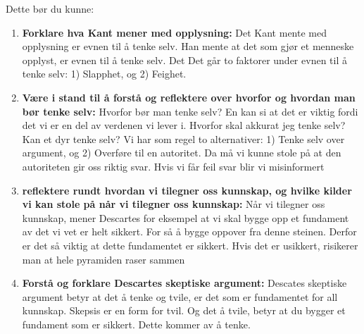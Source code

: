 \documentclass[11pt]{article}
\begin{document}
Dette bør du kunne:
\begin{enumerate}
    \item \textbf{Forklare hva Kant mener med opplysning:} Det Kant mente med opplysning er evnen til å tenke selv. Han mente at det som gjør et menneske opplyst, er evnen til å tenke selv. Det Det går to faktorer under evnen til å tenke selv: 1) Slapphet, og 2) Feighet.
    \item \textbf{Være i stand til å forstå og reflektere over hvorfor og hvordan man bør tenke selv:} Hvorfor bør man tenke selv? En kan si at det er viktig fordi det vi er en del av verdenen vi lever i. Hvorfor skal akkurat jeg tenke selv? Kan et dyr tenke selv? Vi har som regel to alternativer: 1) Tenke selv over argument, og 2) Overføre til en autoritet. Da må vi kunne stole på at den autoriteten gir oss riktig svar. Hvis vi får feil svar blir vi misinformert
    \item \textbf{reflektere rundt hvordan vi tilegner oss kunnskap, og hvilke kilder vi kan stole på når vi tilegner oss kunnskap:} Når vi tilegner oss kunnskap, mener Descartes for eksempel at vi skal bygge opp et fundament av det vi vet er helt sikkert. For så å bygge oppover fra denne steinen. Derfor er det så viktig at dette fundamentet er sikkert. Hvis det er usikkert, risikerer man at hele pyramiden raser sammen
    \item \textbf{Forstå og forklare Descartes skeptiske argument:} Descates skeptiske argument betyr at det å tenke og tvile, er det som er fundamentet for all kunnskap. Skepsis er en form for tvil. Og det å tvile, betyr at du bygger et fundament som er sikkert. Dette kommer av å tenke. 
\end{enumerate}
\end{document}
